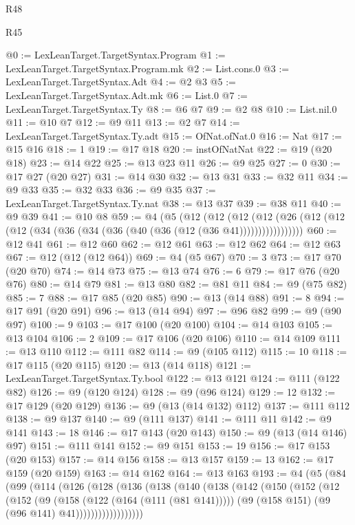\begin{lexlean}{R48}
\begin{lexlean}{R45}
\begin{coremodule}
{{{{{{{{{{{{{{{{{{{{{{{{{{{{{{{{{{{{{{{{{{{{{{{{{{{{{{{{{{{{{{{{{{{{{{{{{{{{{{{{{{{{{{{{{{{@0 := LexLeanTarget.TargetSyntax.Program
@1 := LexLeanTarget.TargetSyntax.Program.mk
@2 := List.cons.{0}
@3 := LexLeanTarget.TargetSyntax.Adt
@4 := @2 @3
@5 := LexLeanTarget.TargetSyntax.Adt.mk
@6 := List.{0}
@7 := LexLeanTarget.TargetSyntax.Ty
@8 := @6 @7
@9 := @2 @8
@10 := List.nil.{0}
@11 := @10 @7
@12 := @9 @11
@13 := @2 @7
@14 := LexLeanTarget.TargetSyntax.Ty.adt
@15 := OfNat.ofNat.{0}
@16 := Nat
@17 := @15 @16
@18 := 1
@19 := @17 @18
@20 := instOfNatNat
@22 := @19 (@20 @18)
@23 := @14 @22
@25 := @13 @23 @11
@26 := @9 @25
@27 := 0
@30 := @17 @27 (@20 @27)
@31 := @14 @30
@32 := @13 @31
@33 := @32 @11
@34 := @9 @33
@35 := @32 @33
@36 := @9 @35
@37 := LexLeanTarget.TargetSyntax.Ty.nat
@38 := @13 @37
@39 := @38 @11
@40 := @9 @39
@41 := @10 @8
@59 := @4
    (@5
      (@12
        (@12
          (@12 (@12 (@26 (@12 (@12 (@12 (@34 (@36 (@34 (@36 (@40 (@36 (@12 (@36 @41)))))))))))))))))
@60 := @12 @41
@61 := @12 @60
@62 := @12 @61
@63 := @12 @62
@64 := @12 @63
@67 := @12 (@12 (@12 @64))
@69 := @4 (@5 @67)
@70 := 3
@73 := @17 @70 (@20 @70)
@74 := @14 @73
@75 := @13 @74
@76 := 6
@79 := @17 @76 (@20 @76)
@80 := @14 @79
@81 := @13 @80
@82 := @81 @11
@84 := @9 (@75 @82)
@85 := 7
@88 := @17 @85 (@20 @85)
@90 := @13 (@14 @88)
@91 := 8
@94 := @17 @91 (@20 @91)
@96 := @13 (@14 @94)
@97 := @96 @82
@99 := @9 (@90 @97)
@100 := 9
@103 := @17 @100 (@20 @100)
@104 := @14 @103
@105 := @13 @104
@106 := 2
@109 := @17 @106 (@20 @106)
@110 := @14 @109
@111 := @13 @110
@112 := @111 @82
@114 := @9 (@105 @112)
@115 := 10
@118 := @17 @115 (@20 @115)
@120 := @13 (@14 @118)
@121 := LexLeanTarget.TargetSyntax.Ty.bool
@122 := @13 @121
@124 := @111 (@122 @82)
@126 := @9 (@120 @124)
@128 := @9 (@96 @124)
@129 := 12
@132 := @17 @129 (@20 @129)
@136 := @9 (@13 (@14 @132) @112)
@137 := @111 @112
@138 := @9 @137
@140 := @9 (@111 @137)
@141 := @111 @11
@142 := @9 @141
@143 := 18
@146 := @17 @143 (@20 @143)
@150 := @9 (@13 (@14 @146) @97)
@151 := @111 @141
@152 := @9 @151
@153 := 19
@156 := @17 @153 (@20 @153)
@157 := @14 @156
@158 := @13 @157
@159 := 13
@162 := @17 @159 (@20 @159)
@163 := @14 @162
@164 := @13 @163
@193 := @4
    (@5
      (@84
        (@99
          (@114
            (@126
              (@128
                (@136
                  (@138
                    (@140
                      (@138
                        (@142
                          (@150
                            (@152
                              (@12
                                (@152
                                  (@9
                                    (@158 (@122 (@164 (@111 (@81 @141)))))
                                    (@9 (@158 @151) (@9 (@96 @141) @41))))))))))))))))))
}}}}}}}}}}}}}}}}}}}}}}}}}}}}}}}}}}}}}}}}}}}}}}}}}}}}}}}}}}}}}}}}}}}}}}}}}}}}}}}}}}}}}}}}}}}
\end{coremodule}
\end{lexlean}
\end{lexlean}
